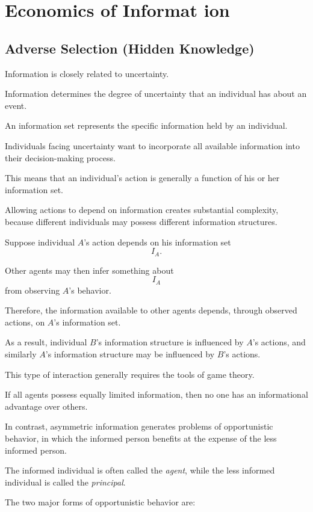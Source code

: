 \chapter{Economics of Informat ion}


\section{Adverse Selection (Hidden Knowledge)}

Information is closely related to uncertainty.

Information determines the degree of uncertainty that an individual has about an event.

An information set represents the specific information held by an individual.

Individuals facing uncertainty want to incorporate all available information into their decision-making process.

This means that an individual's action is generally a function of his or her information set.

Allowing actions to depend on information creates substantial complexity, because different individuals may possess different information structures.

Suppose individual \(A\)'s action depends on his information set
\[
I_A.
\]

Other agents may then infer something about
\[
I_A
\]
from observing \(A\)'s behavior.

Therefore, the information available to other agents depends, through observed actions, on \(A\)'s information set.

As a result, individual \(B\)'s information structure is influenced by \(A\)'s actions, and similarly \(A\)'s information structure may be influenced by \(B\)'s actions.

This type of interaction generally requires the tools of game theory.

If all agents possess equally limited information, then no one has an informational advantage over others.

In contrast, asymmetric information generates problems of opportunistic behavior, in which the informed person benefits at the expense of the less informed person.

The informed individual is often called the \emph{agent}, while the less informed individual is called the \emph{principal}.

The two major forms of opportunistic behavior are:

